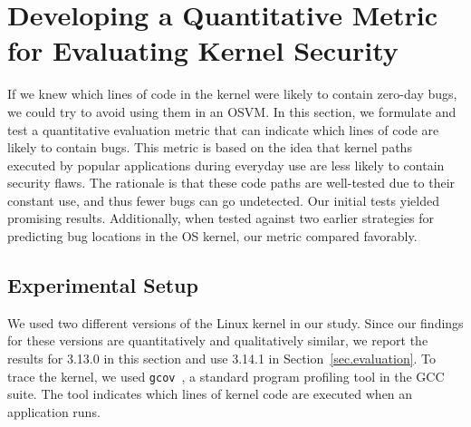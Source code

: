 \section{Developing a Quantitative Metric for Evaluating Kernel Security}
\label{sec.metric}

If we knew which lines of code in the kernel were likely to contain zero-day
bugs, we could try to avoid using them in an OSVM.
In this section, we formulate and test a quantitative evaluation metric that
can indicate which lines of code are likely to contain bugs.
This metric is based on the idea that kernel paths executed by popular
applications
during everyday use are less likely to contain security flaws.
The rationale is that these code paths are well-tested due to their constant
use, and thus fewer bugs can go undetected.
Our initial tests yielded promising results.
Additionally, when tested against two earlier strategies for predicting bug
locations in the OS kernel, our metric compared favorably.

\subsection{Experimental Setup}\label{sec-setup}
We used two different versions of
the Linux kernel in our study.
Since our findings for these versions are quantitatively and qualitatively similar, we report
the results for 3.13.0 in this section and use 3.14.1 in Section~\ref{sec.evaluation}.
%
To trace the kernel, we used \texttt{gcov}~\cite{gcov}, a standard program profiling
tool in the GCC suite. The tool indicates which lines of kernel
code are executed when an application runs.

